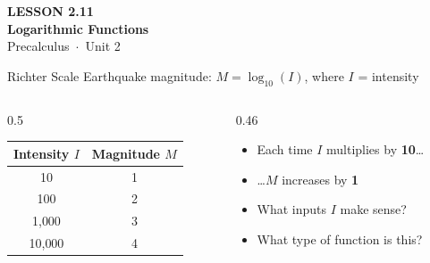 \documentclass[aspectratio=169, 11pt]{beamer}
\begin{document}
{
\begin{frame}[plain]
  \vspace{2.8cm}\hspace{0.55cm}%
  \begin{minipage}{0.9\textwidth}
    {\color{goldacc}\bfseries\small LESSON 2.11}\\[0.5cm]
    {\color{white}\bfseries\LARGE Logarithmic Functions}\\[1.2cm]
    {\color{skymid}\small Precalculus~$\cdot$~Unit 2}
  \end{minipage}
\end{frame}
}

\begin{frame}[t, plain]
  \begin{block}{Richter Scale}
    Earthquake magnitude: $M = \log_{10}(I)$, where $I$ = intensity
  \end{block}

  \vspace{0.3cm}
  \begin{columns}[T]
    \begin{column}{0.5\textwidth}
      \begin{tabular}{|c|c|}
        \hline
        \textbf{Intensity $I$} & \textbf{Magnitude $M$} \\
        \hline
        10 & 1 \\
        100 & 2 \\
        1{,}000 & 3 \\
        10{,}000 & 4 \\
        \hline
      \end{tabular}
    \end{column}
    \begin{column}{0.46\textwidth}
      \begin{itemize}
        \setlength{\itemsep}{8pt}
        \item Each time $I$ multiplies by \textbf{10}\ldots
        \item \ldots $M$ increases by \textbf{1}
        \item What inputs $I$ make sense?
        \item What type of function is this?
      \end{itemize}
    \end{column}
  \end{columns}
\end{frame}
\end{document}
